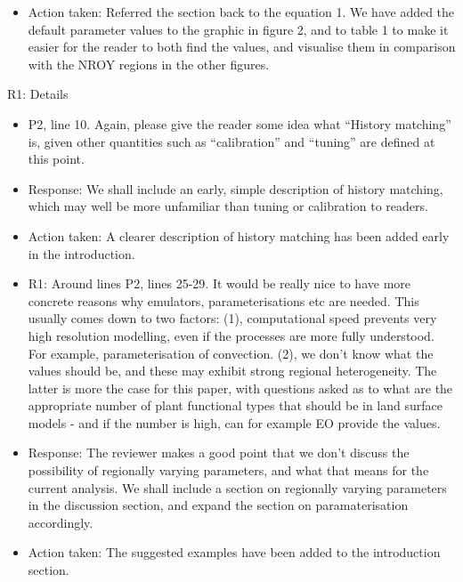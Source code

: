 \documentclass[esd, manuscript]{copernicus}
\begin{document}
\begin{itemize}
\item{Action taken: Referred the section back to the equation 1. We have added the default parameter values to the graphic in figure 2, and to table 1 to make it easier for the reader to both find the values, and visualise them in comparison with the NROY regions in the other figures.}

\end{itemize}

R1: Details

\begin{itemize}

\item{P2, line 10. Again, please give the reader some idea what ``History matching'' is, given other quantities such as ``calibration'' and ``tuning'' are defined at this point.}

\item{Response: We shall include an early, simple description of history matching, which may well be more unfamiliar than tuning or calibration to readers.}

\item{Action taken: A clearer description of history matching has been added early in the introduction.}

\item{R1: Around lines P2, lines 25-29. It would be really nice to have more concrete reasons why emulators, parameterisations etc are needed. This usually comes down to two factors: (1), computational speed prevents very high resolution modelling, even if the processes are more fully understood. For example, parameterisation of convection. (2), we don't know what the values should be, and these may exhibit strong regional heterogeneity. The latter is more the case for this paper, with questions asked as to what are the appropriate number of plant functional types that should be in land surface models - and if the number is high, can for example EO provide the values.}

\item{Response: The reviewer makes a good point that we don't discuss the possibility of regionally varying parameters, and what that means for the current analysis. We shall include a section on regionally varying parameters in the discussion section, and expand the section on paramaterisation accordingly.}

\item{Action taken: The suggested examples have been added to the introduction section.}


\end{itemize}
\end{document}
